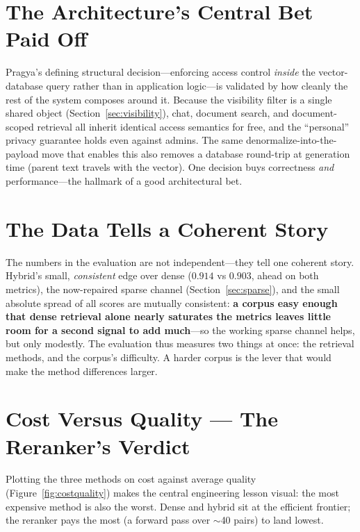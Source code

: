 \documentclass[11pt,a4paper,oneside]{report}
\begin{document}
\section{The Architecture's Central Bet Paid Off}
Pragya's defining structural decision---enforcing access control \emph{inside} the vector-database
query rather than in application logic---is validated by how cleanly the rest of the system composes
around it. Because the visibility filter is a single shared object (Section~\ref{sec:visibility}), chat,
document search, and document-scoped retrieval all inherit identical access semantics for free, and the
``personal'' privacy guarantee holds even against admins. The same denormalize-into-the-payload move
that enables this also removes a database round-trip at generation time (parent text travels with the
vector). One decision buys correctness \emph{and} performance---the hallmark of a good architectural
bet.

\section{The Data Tells a Coherent Story}
The numbers in the evaluation are not independent---they tell one coherent story. Hybrid's small,
\emph{consistent} edge over dense ($0.914$ vs $0.903$, ahead on both metrics), the now-repaired sparse
channel (Section~\ref{sec:sparse}), and the small absolute spread of all scores are mutually consistent:
\textbf{a corpus easy enough that dense retrieval alone nearly saturates the metrics leaves little room
for a second signal to add much}---so the working sparse channel helps, but only modestly. The
evaluation thus measures two things at once: the retrieval methods, and the corpus's difficulty. A
harder corpus is the lever that would make the method differences larger.

\section{Cost Versus Quality --- The Reranker's Verdict}
Plotting the three methods on cost against average quality (Figure~\ref{fig:costquality}) makes the
central engineering lesson visual: the most expensive method is also the worst. Dense and hybrid sit at
the efficient frontier; the reranker pays the most (a forward pass over $\sim$40 pairs) to land lowest.
\end{document}
